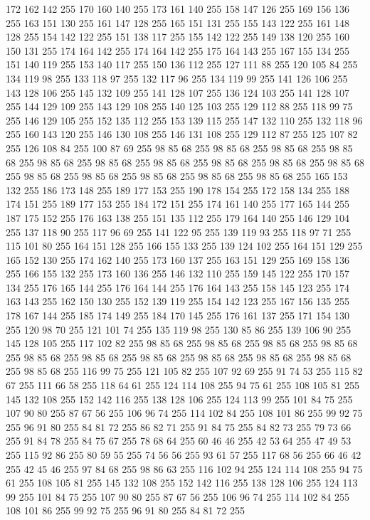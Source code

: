172 162 142 255 170 160 140 255 173 161 140 255 158 147 126 255 169 156 136 255 163 151 130 255 161 147 128 255 165 151 131 255 155 143 122 255 161 148 128 255 154 142 122 255 151 138 117 255 155 142 122 255 149 138 120 255 160 150 131 255 174 164 142 255 174 164 142 255 175 164 143 255 167 155 134 255 151 140 119 255 153 140 117 255 150 136 112 255 127 111 88 255 120 105 84 255 134 119 98 255 133 118 97 255 132 117 96 255 134 119 99 255 141 126 106 255 143 128 106 255 145 132 109 255 141 128 107 255 136 124 103 255 141 128 107 255 144 129 109 255 143 129 108 255 140 125 103 255 129 112 88 255 118 99 75 255 146 129 105 255 152 135 112 255 153 139 115 255 147 132 110 255 132 118 96 255 160 143 120 255 146 130 108 255 146 131 108 255 129 112 87 255 125 107 82 255 126 108 84 255 100 87 69 255 98 85 68 255 98 85 68 255 98 85 68 255 98 85 68 255 98 85 68 255 98 85 68 255 98 85 68 255 98 85 68 255 98 85 68 255 98 85 68 255 98 85 68 255 98 85 68 255 98 85 68 255
98 85 68 255 98 85 68 255 165 153 132 255 186 173 148 255 189 177 153 255 190 178 154 255 172 158 134 255 188 174 151 255 189 177 153 255 184 172 151 255 174 161 140 255 177 165 144 255 187 175 152 255 176 163 138 255 151 135 112 255 179 164 140 255 146 129 104 255 137 118 90 255 117 96 69 255 141 122 95 255 139 119 93 255 118 97 71 255 115 101 80 255 164 151 128 255 166 155 133 255 139 124 102 255 164 151 129 255 165 152 130 255 174 162 140 255 173 160 137 255 163 151 129 255 169 158 136 255 166 155 132 255 173 160 136 255 146 132 110 255 159 145 122 255 170 157 134 255 176 165 144 255 176 164 144 255 176 164 143 255 158 145 123 255 174 163 143 255 162 150 130 255 152 139 119 255 154 142 123 255 167 156 135 255 178 167 144 255 185 174 149 255 184 170 145 255 176 161 137 255 171 154 130 255 120 98 70 255 121 101 74 255 135 119 98 255 130 85 86 255 139 106 90 255 145 128 105 255 117 102 82 255 98 85 68 255 98 85 68 255 98 85 68 255 98 85 68 255 98 85 68 255 98 85 68 255
98 85 68 255 98 85 68 255 98 85 68 255 98 85 68 255 98 85 68 255 116 99 75 255 121 105 82 255 107 92 69 255 91 74 53 255 115 82 67 255 111 66 58 255 118 64 61 255 124 114 108 255 94 75 61 255 108 105 81 255 145 132 108 255 152 142 116 255 138 128 106 255 124 113 99 255 101 84 75 255 107 90 80 255 87 67 56 255 106 96 74 255 114 102 84 255 108 101 86 255 99 92 75 255 96 91 80 255 84 81 72 255 86 82 71 255 91 84 75 255 84 82 73 255 79 73 66 255 91 84 78 255 84 75 67 255 78 68 64 255 60 46 46 255 42 53 64 255 47 49 53 255 115 92 86 255 80 59 55 255 74 56 56 255 93 61 57 255 117 68 56 255 66 46 42 255 42 45 46 255 97 84 68 255 98 86 63 255 116 102 94 255 124 114 108 255 94 75 61 255 108 105 81 255 145 132 108 255 152 142 116 255 138 128 106 255 124 113 99 255 101 84 75 255 107 90 80 255 87 67 56 255 106 96 74 255 114 102 84 255 108 101 86 255 99 92 75 255 96 91 80 255 84 81 72 255
